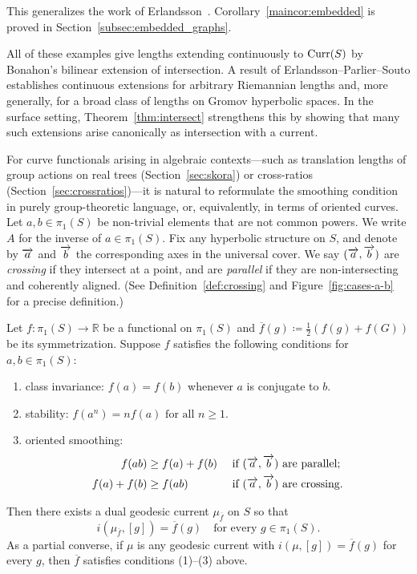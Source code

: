 This generalizes the work of Erlandsson~\cite{Erlandsson:WordLength}.
Corollary~\ref{maincor:embedded} is proved in
Section~\ref{subsec:embedded_graphs}.

All of these examples give lengths extending continuously to $\operatorname{Curr}(S)$
by Bonahon’s bilinear extension of intersection. A result
of Erlandsson--Parlier--Souto \cite[Theorem~1.5]{EPS20:CountingCurves}
establishes continuous
extensions for arbitrary Riemannian lengths and, more generally, for a
broad class of lengths on Gromov hyperbolic spaces. In the surface
setting, Theorem~\ref{thm:intersect} strengthens this by showing that
many such extensions arise canonically as intersection with a current.
    
    For curve functionals arising in algebraic contexts---such as
    translation lengths of group actions on real trees
    (Section~\ref{sec:skora}) or cross-ratios
    (Section~\ref{sec:crossratios})---it is natural to reformulate the
    smoothing condition in purely group-theoretic language, or, equivalently, in terms of
    oriented curves.
    Let $a,b \in \pi_1(S)$ be non-trivial elements that are not common
    powers. We write $A$ for the inverse of $a \in \pi_1(S)$. Fix any
    hyperbolic structure on $S$, and denote by $\overrightarrow{a}$ and $\overrightarrow{b}$
    the corresponding axes in the universal cover. We say $(\overrightarrow{a}, \overrightarrow{b})$ are \emph{crossing} if they intersect at a point, and are \emph{parallel} if they are non-intersecting and coherently aligned. (See
Definition~\ref{def:crossing} and
    Figure~\ref{fig:cases-a-b} for a precise definition.)

\begin{mainthmprime}
\label{thm:intersections_group}
Let $f \colon \pi_1(S) \to \mathbb{R}$ be a functional on $\pi_1(S)$
and $\overline{f}(g) \coloneqq \frac{1}{2} \left(f(g) + f(G) \right)$
be its symmetrization.
Suppose $f$ satisfies the following conditions for $a,b \in \pi_1(S)$:
\begin{enumerate}
\item class invariance: $f(a)=f(b)$ whenever $a$ is conjugate to $b$.
\item stability: 
$f(a^n)=n f(a) \mbox{ for all } n \geq 1$.
\item oriented smoothing:
 \begin{align}
    \label{eq:conn_oriented} f(ab) &\geq f(a) + f(b) && \mbox{ if } (\overrightarrow{a},\overrightarrow{b})\mbox{ are } \mbox{parallel;} \\
    \label{eq:disconn_oriented} f(a) + f(b) &\geq f(ab)  && \mbox{ if }  (\overrightarrow{a},\overrightarrow{b})\mbox{ are } \mbox{crossing}.
  \end{align}
\end{enumerate}
Then there exists a dual geodesic current $\mu_{\overline{f}}$ on $S$ so that
\begin{equation*}
i(\mu_{\overline{f}}, [g]) = \overline{f}(g)
\quad\text{for every }g \in \pi_1(S).
\end{equation*}
As a partial converse, if $\mu$ is any geodesic current with
$i(\mu,[g]) = \overline{f}(g)$ for every $g$, then $\overline{f}$ satisfies
conditions (1)--(3) above.
\end{mainthmprime}


